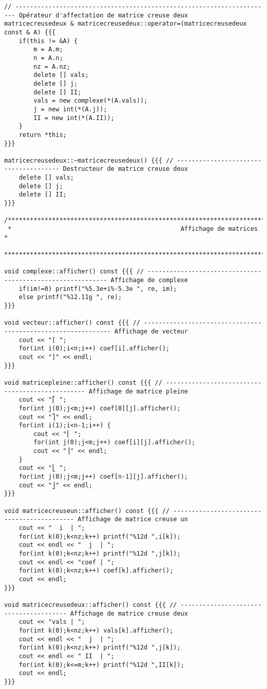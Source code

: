 \documentclass[a4paper]{article}
\begin{document}
\begin{verbatim}
// ---------------------------------------------------------------------- Opérateur d'affectation de matrice creuse deux
matricecreusedeux & matricecreusedeux::operator=(matricecreusedeux const & A) {{{ 
    if(this != &A) {
        m = A.m;
        n = A.n;
        nz = A.nz;
        delete [] vals;
        delete [] j;
        delete [] II;
        vals = new complexe(*(A.vals));
        j = new int(*(A.j));
        II = new int(*(A.II));
    }
    return *this;
}}}

matricecreusedeux::~matricecreusedeux() {{{ // -------------------------------------- Destructeur de matrice creuse deux
    delete [] vals;
    delete [] j;
    delete [] II;
}}}

/**********************************************************************************************************************
 *                                              Affichage de matrices                                                 *
 **********************************************************************************************************************/

void complexe::afficher() const {{{ // ----------------------------------------------------------- Affichage de complexe
    if(im!=0) printf("%5.3e+i%-5.3e ", re, im);
    else printf("%12.11g ", re);
}}}

void vecteur::afficher() const {{{ // ------------------------------------------------------------- Affichage de vecteur
    cout << "[ ";
    for(int i(0);i<n;i++) coef[i].afficher();
    cout << "]" << endl;
}}}

void matricepleine::afficher() const {{{ // ------------------------------------------------ Affichage de matrice pleine
    cout << "⎡ ";
    for(int j(0);j<m;j++) coef[0][j].afficher();
    cout << "⎤" << endl;
    for(int i(1);i<n-1;i++) {
        cout << "⎢ ";
        for(int j(0);j<m;j++) coef[i][j].afficher();
        cout << "⎥" << endl;
    }
    cout << "⎣ ";
    for(int j(0);j<m;j++) coef[n-1][j].afficher();
    cout << "⎦" << endl;
}}}

void matricecreuseun::afficher() const {{{ // ------------------------------------------- Affichage de matrice creuse un
    cout << "  i  | ";
    for(int k(0);k<nz;k++) printf("%12d ",i[k]);
    cout << endl << "  j  | ";
    for(int k(0);k<nz;k++) printf("%12d ",j[k]);
    cout << endl << "coef | ";
    for(int k(0);k<nz;k++) coef[k].afficher();
    cout << endl;
}}}

void matricecreusedeux::afficher() const {{{ // --------------------------------------- Affichage de matrice creuse deux
    cout << "vals | ";
    for(int k(0);k<nz;k++) vals[k].afficher();
    cout << endl << "  j  | ";
    for(int k(0);k<nz;k++) printf("%12d ",j[k]);
    cout << endl << " II  | ";
    for(int k(0);k<=m;k++) printf("%12d ",II[k]);
    cout << endl;
}}}


\end{verbatim}
\end{document}
